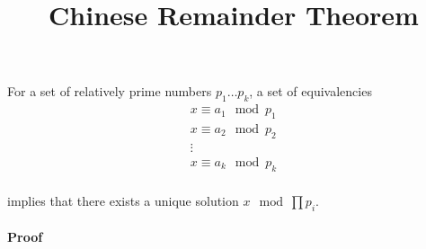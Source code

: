 \documentclass{article}
\title{Chinese Remainder Theorem}
\begin{document}
\maketitle

For a set of relatively prime numbers $p_1 \dots p_k$, a set of equivalencies
\begin{align*}
x \equiv a_1 \mod p_1 \\
x \equiv a_2 \mod p_2 \\
\vdots \\
x \equiv a_k \mod p_k \\
\end{align*}

implies that there exists a unique solution $x \mod \prod p_i$.

\paragraph{Proof}
\end{document}
